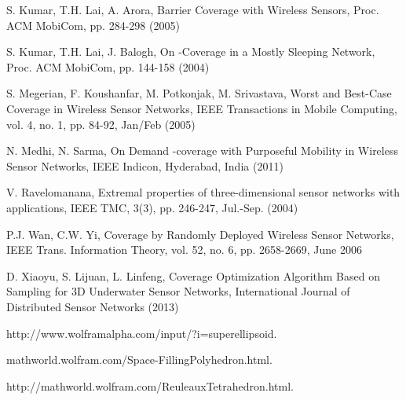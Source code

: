 \documentclass[conference]{IEEEtran}
\begin{document}
\begin{thebibliography}{99}

S. Kumar, T.H. Lai, A. Arora, Barrier Coverage with Wireless Sensors, Proc. ACM MobiCom, pp. 284-298 (2005)


S. Kumar, T.H. Lai, J. Balogh, On -Coverage in a Mostly Sleeping Network, Proc. ACM MobiCom, pp. 144-158 (2004)


S. Megerian, F. Koushanfar, M. Potkonjak, M. Srivastava, Worst and Best-Case Coverage in Wireless Sensor Networks, IEEE Transactions in Mobile Computing, vol. 4, no. 1, pp. 84-92, Jan/Feb (2005)


N. Medhi, N. Sarma, On Demand -coverage with Purposeful Mobility in Wireless Sensor Networks, IEEE Indicon, Hyderabad, India (2011)


V. Ravelomanana, Extremal properties of three-dimensional sensor networks with applications, IEEE TMC, 3(3), pp. 246-247, Jul.-Sep. (2004)


P.J. Wan, C.W. Yi, Coverage by Randomly Deployed Wireless Sensor Networks, IEEE Trans. Information Theory, vol. 52, no. 6, pp. 2658-2669, June 2006


D. Xiaoyu, S. Lijuan, L. Linfeng, Coverage Optimization Algorithm Based on Sampling for 3D Underwater Sensor Networks, International Journal of Distributed Sensor Networks (2013)

http://www.wolframalpha.com/input/?i=superellipsoid.

mathworld.wolfram.com/Space-FillingPolyhedron.html.

http://mathworld.wolfram.com/ReuleauxTetrahedron.html.


\end{thebibliography}
\end{document}
